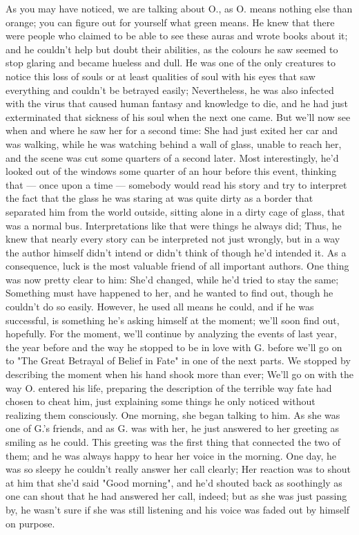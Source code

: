 As you may have noticed, we are talking about O., as O. means nothing else than orange; you can figure out for yourself what green means. 
He knew that there were people who claimed to be able to see these auras and wrote books about it; and he couldn't help but doubt their abilities, as the colours he saw seemed to stop glaring and became hueless and dull. He was one of the only creatures to notice this loss of souls or at least qualities of soul with his eyes that saw everything and couldn't be betrayed easily; Nevertheless, he was also infected with the virus that caused human fantasy and knowledge to die, and he had just exterminated that sickness of his soul when the next one came. 
But we'll now see when and where he saw her for a second time: She had just exited her car and was walking, while he was watching behind a wall of glass, unable to reach her, and the scene was cut some quarters of a second later. Most interestingly, he'd looked out of the windows some quarter of an hour before this event, thinking that --- once upon a time --- somebody would read his story and try to interpret the fact that the glass he was staring at was quite dirty as a border that separated him from the world outside, sitting alone in a dirty cage of glass, that was a normal bus. Interpretations like that were things he always did; Thus, he knew that nearly every story can be interpreted not just wrongly, but in a way the author himself didn't intend or didn't think of though he'd intended it. As a consequence, luck is the most valuable friend of all important authors. 
One thing was now pretty clear to him: She'd changed, while he'd tried to stay the same; Something must have happened to her, and he wanted to find out, though he couldn't do so easily. However, he used all means he could, and if he was successful, is something he's asking himself at the moment; we'll soon find out, hopefully. 
For the moment, we'll continue by analyzing the events of last year, the year before and the way he stopped to be in love with G. before we'll go on to "The Great Betrayal of Belief in Fate" in one of the next parts. 
We stopped by describing the moment when his hand shook more than ever; We'll go on with the way O. entered his life, preparing the description of the terrible way fate had chosen to cheat him, just explaining some things he only noticed without realizing them consciously. 
One morning, she began talking to him. As she was one of G.'s friends, and as G. was with her, he just answered to her greeting as smiling as he could. This greeting was the first thing that connected the two of them; and he was always happy to hear her voice in the morning. One day, he was so sleepy he couldn't really answer her call clearly; Her reaction was to shout at him that she'd said "Good morning", and he'd shouted back as soothingly as one can shout that he had answered her call, indeed; but as she was just passing by, he wasn't sure if she was still listening and his voice was faded out by himself on purpose. 
